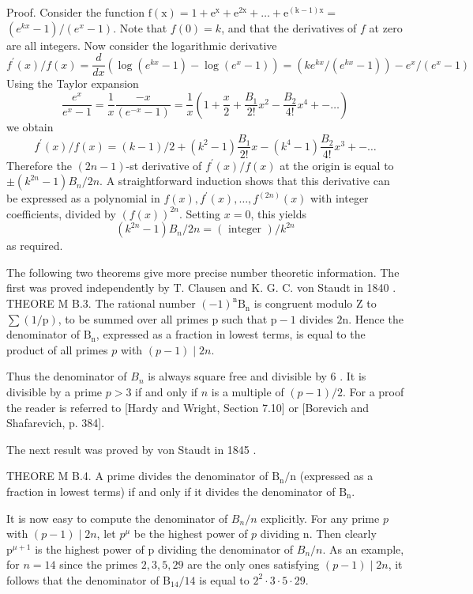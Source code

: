 \documentclass[10pt]{article}
\begin{document}
Proof. Consider the function $\mathrm{f}(\mathrm{x})=1+\mathrm{e}^{\mathrm{x}}+\mathrm{e}^{2 \mathrm{x}}+\ldots+\mathrm{e}^{(\mathrm{k}-1) \mathrm{x}}=$ $\left(e^{k x}-1\right) /\left(e^{x}-1\right)$. Note that $f(0)=k$, and that the derivatives of $f$ at zero are all integers. Now consider the logarithmic derivative
$$
f^{\prime}(x) / f(x)=\frac{d}{d x}\left(\log \left(e^{k x}-1\right)-\log \left(e^{x}-1\right)\right)=\left(k e^{k x} /\left(e^{k x}-1\right)\right)-e^{x} /\left(e^{x}-1\right)
$$
Using the Taylor expansion
$$
\frac{e^{x}}{e^{x}-1}=\frac{1}{x} \frac{-x}{\left(e^{-x}-1\right)}=\frac{1}{x}\left(1+\frac{x}{2}+\frac{B_{1}}{2 !} x^{2}-\frac{B_{2}}{4 !} x^{4}+-\ldots\right)
$$
we obtain
$$
f^{\prime}(x) / f(x)=(k-1) / 2+\left(k^{2}-1\right) \frac{B_{1}}{2 !} x-\left(k^{4}-1\right) \frac{B_{2}}{4 !} x^{3}+-\ldots
$$
Therefore the $(2 n-1)$-st derivative of $f^{\prime}(x) / f(x)$ at the origin is equal to $\pm\left(k^{2 n}-1\right) B_{n} / 2 n$. A straightforward induction shows that this derivative can be expressed as a polynomial in $f(x), f^{\prime}(x), \ldots, f^{(2 n)}(x)$ with integer coefficients, divided by $(f(x))^{2 n}$. Setting $x=0$, this yields
$$
\left(k^{2 n}-1\right) B_{n} / 2 n=(\text { integer }) / k^{2 n}
$$
as required.

The following two theorems give more precise number theoretic information. The first was proved independently by $\mathrm{T}$. Clausen and K. G. C. von Staudt in 1840 . THEORE M B.3. The rational number $(-1)^{\mathrm{n}} \mathrm{B}_{\mathrm{n}}$ is congruent modulo $\mathrm{Z}$ to $\sum(1 / \mathrm{p})$, to be summed over all primes $\mathrm{p}$ such that $\mathrm{p}-1$ divides $2 \mathrm{n}$. Hence the denominator of $\mathrm{B}_{\mathrm{n}}$, expressed as a fraction in lowest terms, is equal to the product of all primes $p$ with $(p-1) \mid 2 n$.

Thus the denominator of $B_{n}$ is always square free and divisible by 6 . It is divisible by a prime $p>3$ if and only if $n$ is a multiple of $(p-1) / 2$. For a proof the reader is referred to [Hardy and Wright, Section 7.10] or [Borevich and Shafarevich, p. 384].

The next result was proved by von Staudt in 1845 .

THEORE M B.4. A prime divides the denominator of $\mathrm{B}_{\mathrm{n}} / \mathrm{n}$ (expressed as a fraction in lowest terms) if and only if it divides the denominator of $\mathrm{B}_{\mathrm{n}}$.

It is now easy to compute the denominator of $B_{n} / n$ explicitly. For any prime $p$ with $(p-1) \mid 2 n$, let $p^{\mu}$ be the highest power of $p$ dividing n. Then clearly $\mathrm{p}^{\mu+1}$ is the highest power of $\mathrm{p}$ dividing the denominator of $B_{n} / n$. As an example, for $n=14$ since the primes $2,3,5,29$ are the only ones satisfying $(p-1) \mid 2 n$, it follows that the denominator of $\mathrm{B}_{14} / 14$ is equal to $2^{2} \cdot 3 \cdot 5 \cdot 29$.
\end{document}
